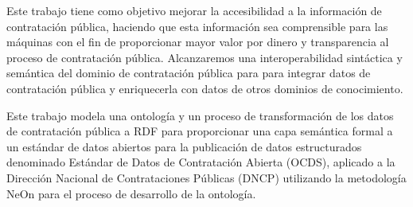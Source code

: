 \begin{resuingles}

Este trabajo tiene como objetivo mejorar la accesibilidad a la información de contratación pública, haciendo que esta información sea comprensible para las máquinas con el fin de proporcionar mayor valor por dinero y transparencia al proceso de contratación pública. Alcanzaremos una interoperabilidad sintáctica y semántica del dominio de contratación pública para para integrar datos de contratación pública y enriquecerla con datos de otros dominios de conocimiento.

Este trabajo modela una ontología y un proceso de transformación de los datos de contratación pública a RDF para proporcionar una capa semántica formal a un estándar de datos abiertos para la publicación de datos estructurados denominado Estándar de Datos de Contratación Abierta (OCDS), aplicado a la Dirección Nacional de Contrataciones Públicas (DNCP) utilizando la metodología NeOn para el proceso de desarrollo de la ontología.

\end{resuingles}


